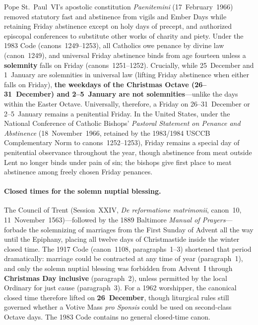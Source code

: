 Pope St.~Paul~VI's apostolic constitution \textit{Paenitemini} (17~February~1966)
removed statutory fast and abstinence from vigils and Ember Days while retaining
Friday abstinence except on holy days of precept, and authorized episcopal
conferences to substitute other works of charity and piety. Under the 1983 Code
(canons~1249--1253), all Catholics owe penance by divine law (canon~1249), and
universal Friday abstinence binds from age fourteen unless a \textbf{solemnity}
falls on Friday (canons~1251--1252). Crucially, while 25~December and 1~January
are solemnities in universal law (lifting Friday abstinence when either falls on
Friday), \textbf{the weekdays of the Christmas Octave (26--31~December) and
2--5~January are not solemnities}---unlike the days within the Easter Octave.
Universally, therefore, a Friday on 26--31~December or 2--5~January remains a
penitential Friday. In the United States, under the National Conference of
Catholic Bishops' \textit{Pastoral Statement on Penance and Abstinence}
(18~November~1966, retained by the 1983/1984 USCCB Complementary Norm to
canons~1252--1253), Friday remains a special day of penitential observance
throughout the year, though abstinence from meat outside Lent no longer binds
under pain of sin; the bishops give first place to meat abstinence among freely
chosen Friday penances.

\paragraph{Closed times for the solemn nuptial blessing.}
The Council of Trent (Session~XXIV, \textit{De reformatione matrimonii},
canon~10, 11~November~1563)---followed by the 1889 Baltimore \textit{Manual of
Prayers}---forbade the solemnizing of marriages from the First Sunday of Advent
all the way until the Epiphany, placing all twelve days of Christmastide inside
the winter closed time. The 1917 Code (canon~1108, paragraphs~1--3) shortened
that period dramatically: marriage could be contracted at any time of year
(paragraph~1), and only the solemn nuptial blessing was forbidden from Advent~I
through \textbf{Christmas Day inclusive} (paragraph~2), unless permitted by the
local Ordinary for just cause (paragraph~3). For a 1962 worshipper, the
canonical closed time therefore lifted on \textbf{26~December}, though liturgical
rules still governed whether a Votive Mass \textit{pro Sponsis} could be used on
second-class Octave days. The 1983 Code contains no general closed-time canon.

